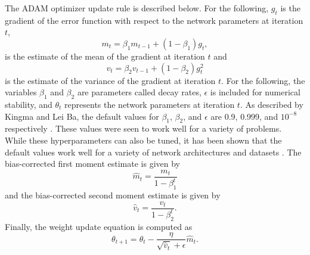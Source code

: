 The ADAM optimizer update rule is described below. For the following, $g_t$ is the gradient of the error function with respect to the network parameters at iteration $t$, 
\begin{equation} \label{eq:adam1}
m_t = \beta_1 m_{t-1} + (1 - \beta_1) g_t,
\end{equation}
is the estimate of the mean of the gradient at iteration $t$ and
\begin{equation} \label{eq:adam2}
v_t = \beta_2 v_{t-1} + (1 - \beta_2) g_t^2
\end{equation}
is the estimate of the variance of the gradient at iteration $t$. For the following, the variables $\beta_1$ and $\beta_2$ are parameters called decay rates, $\epsilon$ is included for numerical stability, and $\theta_t$ represents the network parameters at iteration $t$. As described by Kingma and Lei Ba, the default values for $\beta_1$, $\beta_2$, and $\epsilon$ are 0.9, 0.999, and $10^{-8}$ respectively \cite{Kingma2015}. These values were seen to work well for a variety of problems. While these hyperparameters can also be tuned, it has been shown that the default values work well for a variety of network architectures and datasets \cite{Kingma2015}. The bias-corrected first moment estimate is given by
\begin{equation} \label{eq:adam3}
\hat{m}_t = \dfrac{m_t}{1 - \beta^t_1}
\end{equation}
and the bias-corrected second moment estimate is given by 
\begin{equation} \label{eq:adam4}
\hat{v}_t = \dfrac{v_t}{1 - \beta^t_2}.
\end{equation}
Finally, the weight update equation is computed as
\begin{equation} \label{eq:adam5}
\theta_{t+1} = \theta_{t} - \dfrac{\eta}{\sqrt{\hat{v}_t} + \epsilon} \hat{m}_t.
\end{equation}





